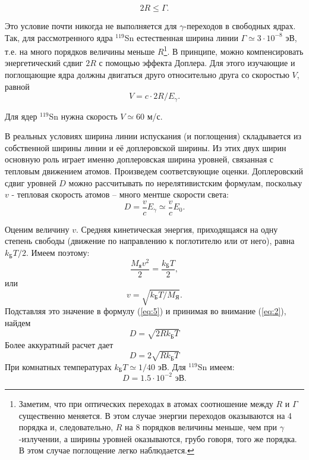 \documentclass[a4paper, 12pt]{article}
\begin{document}
	\begin{equation}
		2R\leqslant\Gamma.
	\end{equation}
	\par
	Это условие почти никогда не выполняется для $\gamma$-переходов в свободных ядрах. Так, для рассмотренного ядра $^{119}$Sn естественная ширина линии $\Gamma\simeq3\cdot10^{-8}$ эВ, т.е. на много порядков величины меньше $R$\footnote{Заметим, что при оптических переходах в атомах соотношение между $R$ и $\Gamma$ существенно меняется. В этом случае энергии переходов оказываются на 4 порядка и, следовательно, $R$ на 8 порядков величины меньше, чем при $\gamma$-излучении, а ширины уровней оказываются, грубо говоря, того же порядка. В этом случае поглощение легко наблюдается.}. В принципе, можно компенсировать энергетический сдвиг $2R$ с помощью эффекта Доплера. Для этого изучающие и поглощающие ядра должны двигаться друго относительно друга со скоростью $V$, равной
	\begin{equation}
		V=c\cdot2R/E_\gamma.
	\end{equation}
	\par
	Для ядер $^{119}$Sn нужна скорость $V\simeq60$ м/с.\par
	В реальных условиях ширина линии испускания (и поглощения) складывается из собственной ширины линии и её доплеровской ширины. Из этих двух ширин основную роль играет именно доплеровская ширина уровней, связанная с тепловым движением атомов. Произведем соответсвующие оценки. Доплеровский сдвиг уровней $D$ можно рассчитывать по нерелятивистским формулам, поскольку $v$ - тепловая скорость атомов – много ментше скорости света:
	\begin{equation}
		D=\frac{v}{c}E_{\gamma}\simeq\frac{v}{c}E_0.
		\label{eq:5}
	\end{equation}
	\par
	Оценим величину $v$. Средняя кинетическая энергия, приходящаяся на одну степень свободы (движение по направлению к поглотителю или от него), равна $k_{\text{Б}} T/2$. Имеем поэтому:
	\begin{equation*}
		\frac{M_{\text{я}}v^2}{2}=\frac{k_{\text{Б}}T}{2},
	\end{equation*}
	или
	\begin{equation}
		v=\sqrt{k_{\text{Б}} T/M_{\text{Я}}}.
	\end{equation}
	Подставляя это значение в формулу (\ref{eq:5}) и принимая во внимание (\ref{eq:2}), найдем
	\begin{equation*}
		D=\sqrt{2 Rk_{\text{Б}}T}
	\end{equation*}
	Более аккуратный расчет дает
	\begin{equation}
		D=2\sqrt{Rk_{\text{Б}}T}
	\end{equation}
	При комнатных температурах $k_{\text{Б}}T\simeq 1/40$ эВ. Для $^{119}$Sn имеем:
	\begin{equation*}
		D=1.5\cdot10^{-2}\text{ эВ}.
	\end{equation*}
\end{document}
